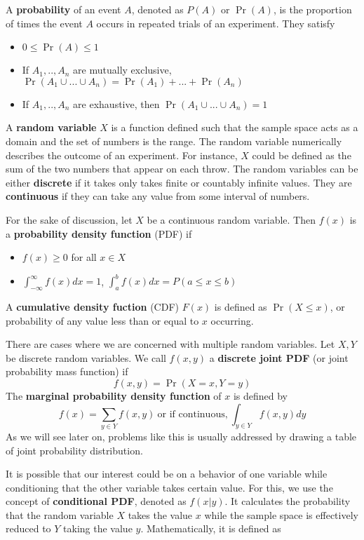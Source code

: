 \documentclass[12pt]{article}
\theoremstyle{definition}
\theoremstyle{property}
\theoremstyle{assumption}
\theoremstyle{example}
\theoremstyle{comment}
\begin{document}
A \textbf{probability} of an event $A$, denoted as $P(A)$ or $\Pr(A)$, is the proportion of times the event $A$ occurs in repeated trials of an experiment. They satisfy
\begin{itemize}
\item $0\leq\Pr(A)\leq1$
\item If $A_1,..,A_n$ are mutually exclusive, $\Pr(A_1\cup ... \cup A_n)=\Pr(A_1)+...+\Pr(A_n)$
\item If $A_1,..,A_n$ are exhaustive, then $\Pr(A_1\cup ... \cup A_n)=1$
\end{itemize} \par\medskip\medskip
A \textbf{random variable} $X$ is a function defined such that the sample space acts as a domain and the set of numbers is the range. The random variable numerically describes the outcome of an experiment. For instance, $X$ could be defined as the sum of the two numbers that appear on each throw. The random variables can be either \textbf{discrete} if it takes only takes finite or countably infinite values. They are \textbf{continuous} if they can take any value from some interval of numbers. \par\medskip\medskip
For the sake of discussion, let $X$ be a continuous random variable. Then $f(x)$ is a \textbf{probability density function} (PDF) if 
\begin{itemize}
\item $f(x)\geq 0$ for all $x\in X$
\item $\int_{-\infty}^\infty f(x)dx=1$, $\int_{a}^b f(x)dx=P(a\leq x \leq b)$
\end{itemize}
A \textbf{cumulative density fuction} (CDF) $F(x)$ is defined as $\Pr(X\leq x)$, or probability of any value less than or equal to $x$ occurring. \par\medskip\medskip
There are cases where we are concerned with multiple random variables. Let $X,Y$ be discrete random variables. We call $f(x,y)$ a \textbf{discrete joint PDF} (or joint probability mass function) if
\[
f(x,y) = \Pr(X=x, Y=y)
\]
The \textbf{marginal probability density function} of $x$ is defined by
\[
f(x) = \sum_{y\in Y}f(x,y) \ \text{or if continuous,} \ \int_{y\in Y}f(x,y)dy 
\]
As we will see later on, problems like this is usually addressed by drawing a table of joint probability distribution. \par\medskip\medskip
It is possible that our interest could be on a behavior of one variable while conditioning that the other variable takes certain value. For this, we use the concept of \textbf{conditional PDF}, denoted as $f(x|y)$. It calculates the probability that the random variable $X$ takes the value $x$ while the sample space is effectively reduced to $Y$ taking the value $y$. Mathematically, it is defined as
\end{document}
